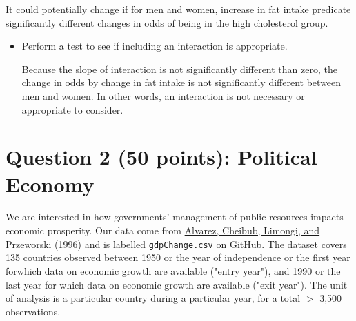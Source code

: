 \documentclass[12pt,letterpaper]{article}
\begin{document}
\begin{enumerate}
\begin{enumerate}
		It could potentially change if for men and women, increase in fat intake predicate significantly different changes in odds of being in the high cholesterol group.
		\begin{itemize}
			\item Perform a test to see if including an interaction is appropriate.
			
			  
			
			Because the slope of interaction is not significantly different than zero, the change in odds by change in fat intake is not significantly different between men and women. In other words, an interaction is not necessary or appropriate to consider.
			
		\end{itemize}
		
	\end{enumerate}
\end{enumerate}
\newpage


\section*{Question 2 (50 points): Political Economy}
\vspace{.25cm}
\noindent We are interested in how governments' management of public resources impacts economic prosperity. Our data come from \href{https://www.researchgate.net/profile/Adam_Przeworski/publication/240357392_Classifying_Political_Regimes/links/0deec532194849aefa000000/Classifying-Political-Regimes.pdf}{Alvarez, Cheibub, Limongi, and Przeworski (1996)} and is labelled \texttt{gdpChange.csv} on GitHub. The dataset covers 135 countries observed between 1950 or the year of independence or the first year forwhich data on economic growth are available ("entry year"), and 1990 or the last year for which data on economic growth are available ("exit year"). The unit of analysis is a particular country during a particular year, for a total $>$ 3,500 observations. 

  
\end{document}
